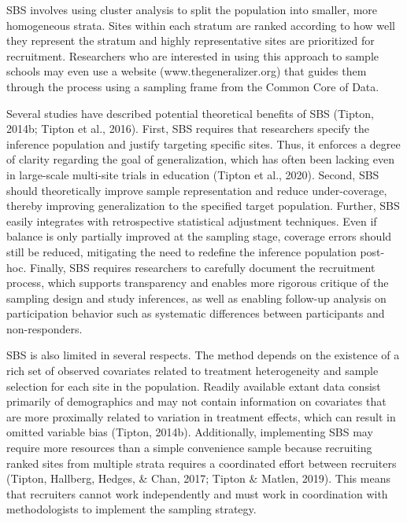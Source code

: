 \documentclass[
  english,
  man,floatsintext]{apa6}
\begin{document}
SBS involves using cluster analysis to split the population into smaller, more homogeneous strata. Sites within each stratum are ranked according to how well they represent the stratum and highly representative sites are prioritized for recruitment.
Researchers who are interested in using this approach to sample schools may even use a website (www.thegeneralizer.org) that guides them through the process using a sampling frame from the Common Core of Data.

Several studies have described potential theoretical benefits of SBS (Tipton, 2014b; Tipton et al., 2016). First, SBS requires that researchers specify the inference population and justify targeting specific sites. Thus, it enforces a degree of clarity regarding the goal of generalization, which has often been lacking even in large-scale multi-site trials in education (Tipton et al., 2020). Second, SBS should theoretically improve sample representation and reduce under-coverage, thereby improving generalization to the specified target population. Further, SBS easily integrates with retrospective statistical adjustment techniques. Even if balance is only partially improved at the sampling stage, coverage errors should still be reduced, mitigating the need to redefine the inference population post-hoc.
Finally, SBS requires researchers to carefully document the recruitment process, which supports transparency and enables more rigorous critique of the sampling design and study inferences, as well as enabling follow-up analysis on participation behavior such as systematic differences between participants and non-responders.

SBS is also limited in several respects. The method depends on the existence of a rich set of observed covariates related to treatment heterogeneity and sample selection for each site in the population. Readily available extant data consist primarily of demographics and may not contain information on covariates that are more proximally related to variation in treatment effects, which can result in omitted variable bias (Tipton, 2014b). Additionally, implementing SBS may require more resources than a simple convenience sample because recruiting ranked sites from multiple strata requires a coordinated effort between recruiters (Tipton, Hallberg, Hedges, \& Chan, 2017; Tipton \& Matlen, 2019). This means that recruiters cannot work independently and must work in coordination with methodologists to implement the sampling strategy.
\end{document}
